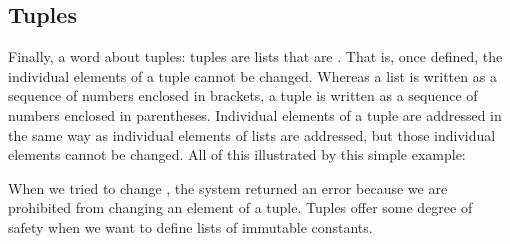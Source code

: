 \documentclass[letterpaper,10pt,english]{sphinxmanual}
\begin{document}
\subsection{Tuples}
\label{\detokenize{chap3/chap3_arrays:tuples}}
\sphinxAtStartPar
Finally, a word about tuples: tuples are lists that are .  That is, once defined, the individual elements of a tuple cannot be changed.  Whereas a list is written as a sequence of numbers enclosed in  brackets, a tuple is written as a sequence of numbers enclosed in  parentheses.  Individual elements of a tuple are addressed in the same way as individual elements of lists are addressed, but those individual elements cannot be changed.  All of this illustrated by this simple example:

\begin{sphinxVerbatim}[commandchars=\\\{\},numbers=left,firstnumber=1,stepnumber=1]
        
\PYG{p}{[}\PYG{p}{]}

\PYG{p}{[}\PYG{p}{]}  
\end{sphinxVerbatim}

\sphinxAtStartPar
When we tried to change , the system returned an error because we are prohibited from changing an element of a tuple.  Tuples offer some degree of safety when we want to define lists of immutable constants.
\end{document}
